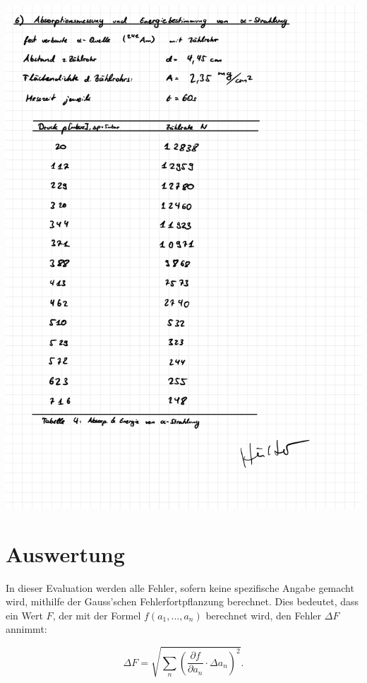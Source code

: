 \documentclass{article}
\begin{document}
\includegraphics[width=\textwidth]{graphics/mess6.jpg}
\newpage

\addtocounter{table}{4}




\clearpage
\newpage
\section{Auswertung}

In dieser Evaluation werden alle Fehler, sofern keine spezifische Angabe gemacht wird, mithilfe der Gauss'schen Fehlerfortpflanzung berechnet. Dies bedeutet, dass ein Wert $F$, der mit der Formel $f(a_1, ..., a_n)$ berechnet wird, den Fehler $\Delta F$ annimmt:

\begin{equation}
    \Delta F = \sqrt{\sum_n \left( \frac{\partial f}{\partial a_n} \cdot \Delta a_n \right)^2}.
\end{equation}
\end{document}
